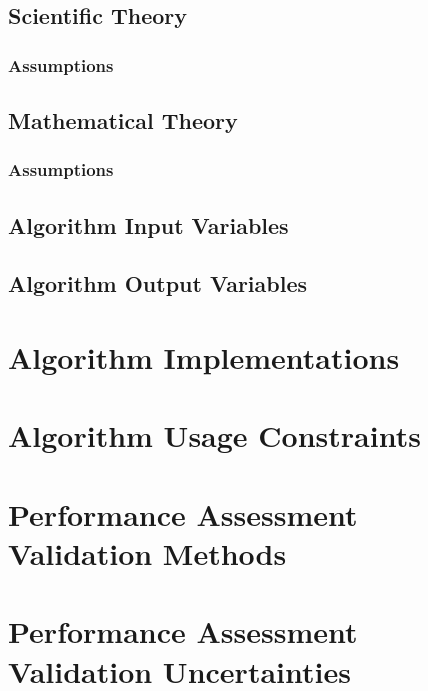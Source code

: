 \subsection{Scientific Theory}
\ScientificTheory

\subsubsection{Assumptions}
\ScientificTheoryAssumptions

\subsection{Mathematical Theory}
\MathematicalTheory

\subsubsection{Assumptions}
\MathematicalTheoryAssumptions

\subsection{Algorithm Input Variables}
\AlgorithmInputVariables

\subsection{Algorithm Output Variables}
\AlgorithmOutputVariables

\section{Algorithm Implementations}
\AlgorithmImplementations

\section{Algorithm Usage Constraints}
\AlgorithmUsageConstraints

\section{Performance Assessment Validation Methods}
\PerformanceAssessmentValidationMethods

\section{Performance Assessment Validation Uncertainties}
\PerformanceAssessmentValidationUncertainties

